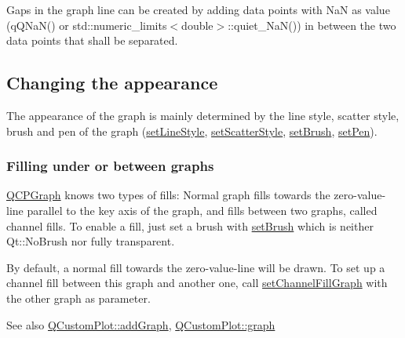 \-Gaps in the graph line can be created by adding data points with \-Na\-N as value ({\ttfamily q\-Q\-Na\-N()} or {\ttfamily std\-::numeric\-\_\-limits$<$double$>$\-::quiet\-\_\-\-Na\-N()}) in between the two data points that shall be separated.\hypertarget{classQCPStatisticalBox_appearance}{}\subsection{\-Changing the appearance}\label{classQCPStatisticalBox_appearance}
\-The appearance of the graph is mainly determined by the line style, scatter style, brush and pen of the graph (\hyperlink{classQCPGraph_a513fecccff5b2a50ce53f665338c60ff}{set\-Line\-Style}, \hyperlink{classQCPGraph_a12bd17a8ba21983163ec5d8f42a9fea5}{set\-Scatter\-Style}, \hyperlink{classQCPAbstractPlottable_a7a4b92144dca6453a1f0f210e27edc74}{set\-Brush}, \hyperlink{classQCPAbstractPlottable_ab74b09ae4c0e7e13142fe4b5bf46cac7}{set\-Pen}).\hypertarget{classQCPGraph_filling}{}\subsubsection{\-Filling under or between graphs}\label{classQCPGraph_filling}
\hyperlink{classQCPGraph}{\-Q\-C\-P\-Graph} knows two types of fills\-: \-Normal graph fills towards the zero-\/value-\/line parallel to the key axis of the graph, and fills between two graphs, called channel fills. \-To enable a fill, just set a brush with \hyperlink{classQCPAbstractPlottable_a7a4b92144dca6453a1f0f210e27edc74}{set\-Brush} which is neither \-Qt\-::\-No\-Brush nor fully transparent.

\-By default, a normal fill towards the zero-\/value-\/line will be drawn. \-To set up a channel fill between this graph and another one, call \hyperlink{classQCPGraph_a2d03156df1b64037a2e36cfa50351ca3}{set\-Channel\-Fill\-Graph} with the other graph as parameter.

\begin{DoxySeeAlso}{\-See also}
\hyperlink{classQCustomPlot_a6fb2873d35a8a8089842d81a70a54167}{\-Q\-Custom\-Plot\-::add\-Graph}, \hyperlink{classQCustomPlot_a6d3ed93c2bf46ab7fa670d66be4cddaf}{\-Q\-Custom\-Plot\-::graph} 
\end{DoxySeeAlso}



